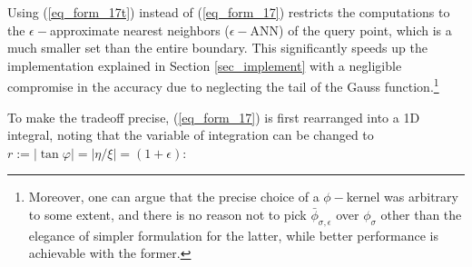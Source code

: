 \documentclass[article]{gmp2014}
\theoremstyle{definition}
\begin{document}
Using (\ref{eq_form_17t}) instead of (\ref{eq_form_17}) restricts the computations to the $\epsilon-$approximate nearest neighbors ($\epsilon-$ANN) of the query point, which is a much smaller set than the entire boundary. This significantly speeds up the implementation explained in Section \ref{sec_implement} with a negligible compromise in the accuracy due to neglecting the tail of the Gauss function.\footnote{Moreover, one can argue that the precise choice of a $\phi-$kernel was arbitrary to some extent, and there is no reason not to pick $\bar{\phi}_{\sigma, \epsilon}$ over $\phi_{\sigma}$ other than the elegance of simpler formulation for the latter, while better performance is achievable with the former.}

To make the tradeoff precise, (\ref{eq_form_17}) is first rearranged into a 1D integral, noting that the variable of integration can be changed to $r := |\tan \varphi| = |\eta/\xi| = (1 + \epsilon)$:
\end{document}
